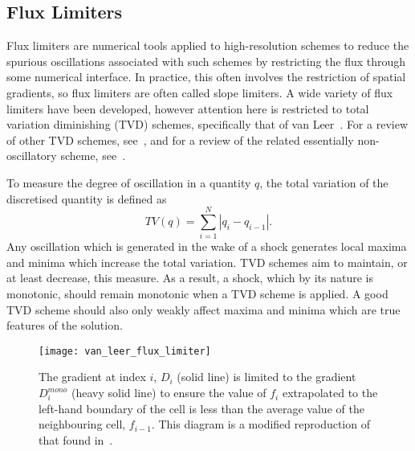 \subsection{Flux Limiters}
\label{sec-flux-limiters}

Flux limiters are numerical tools applied to high-resolution schemes to reduce the spurious oscillations associated with such schemes by restricting the flux through some numerical interface. In practice, this often involves the restriction of spatial gradients, so flux limiters are often called slope limiters. A wide variety of flux limiters have been developed, however attention here is restricted to total variation diminishing (TVD) schemes, specifically that of van Leer~\cite{vanleerUltimateConservativeDifference1997}. For a review of other TVD schemes, see~\cite{zhangReviewTVDSchemes2015}, and for a review of the related essentially non-oscillatory scheme, see~\cite{shuHighOrderENO1999a}. 

To measure the degree of oscillation in a quantity $q$, the total variation of the discretised quantity is defined as
\begin{equation}
  \label{eq:total_variation}
TV(q) = \sum_{i=1}^{N} | q_i - q_{i-1} |.
\end{equation}
Any oscillation which is generated in the wake of a shock generates local maxima and minima which increase the total variation. TVD schemes aim to maintain, or at least decrease, this measure. As a result, a shock, which by its nature is monotonic, should remain monotonic when a TVD scheme is applied. A good TVD scheme should also only weakly affect maxima and minima which are true features of the solution.

\begin{figure}[t]
  \centering
  \texttt{[image: van\_leer\_flux\_limiter]}
  \caption{The gradient at index $i$, $D_i$ (solid line) is limited to the gradient $D_i^{mono}$ (heavy solid line) to ensure the value of $f_i$ extrapolated to the left-hand boundary of the cell is less than the average value of the neighbouring cell, $f_{i-1}$. This diagram is a modified reproduction of that found in~\cite{vanleerUltimateConservativeDifference1997}.}%
  \label{fig:van_leer_flux_limiter}
\end{figure}

